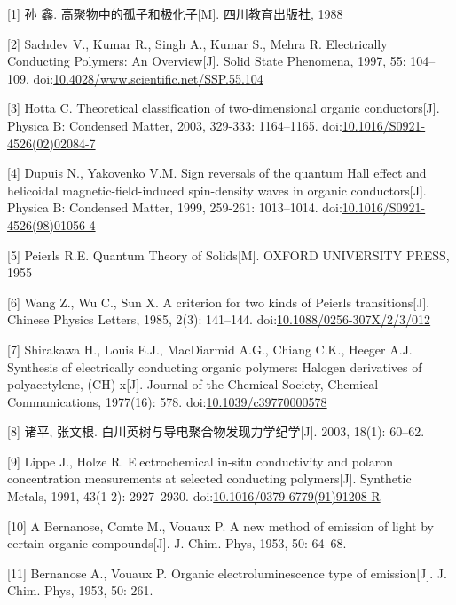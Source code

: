 \documentclass[12pt,]{report}
\begin{document}
\lhead{}  \rhead{} \thispagestyle{empty}

\setlength{\parindent}{0em}

{[}1{]} 孙 鑫. 高聚物中的孤子和极化子{[}M{]}. 四川教育出版社, 1988

{[}2{]} Sachdev V., Kumar R., Singh A., Kumar S., Mehra R. Electrically
Conducting Polymers: An Overview{[}J{]}. Solid State Phenomena, 1997,
55: 104--109.
doi:\href{http://dx.doi.org/10.4028/www.scientific.net/SSP.55.104}{10.4028/www.scientific.net/SSP.55.104}

{[}3{]} Hotta C. Theoretical classification of two-dimensional organic
conductors{[}J{]}. Physica B: Condensed Matter, 2003, 329-333:
1164--1165.
doi:\href{http://dx.doi.org/10.1016/S0921-4526(02)02084-7}{10.1016/S0921-4526(02)02084-7}

{[}4{]} Dupuis N., Yakovenko V.M. Sign reversals of the quantum Hall
effect and helicoidal magnetic-field-induced spin-density waves in
organic conductors{[}J{]}. Physica B: Condensed Matter, 1999, 259-261:
1013--1014.
doi:\href{http://dx.doi.org/10.1016/S0921-4526(98)01056-4}{10.1016/S0921-4526(98)01056-4}

{[}5{]} Peierls R.E. Quantum Theory of Solids{[}M{]}. OXFORD UNIVERSITY
PRESS, 1955

{[}6{]} Wang Z., Wu C., Sun X. A criterion for two kinds of Peierls
transitions{[}J{]}. Chinese Physics Letters, 1985, 2(3): 141--144.
doi:\href{http://dx.doi.org/10.1088/0256-307X/2/3/012}{10.1088/0256-307X/2/3/012}

{[}7{]} Shirakawa H., Louis E.J., MacDiarmid A.G., Chiang C.K., Heeger
A.J. Synthesis of electrically conducting organic polymers: Halogen
derivatives of polyacetylene, (CH) x{[}J{]}. Journal of the Chemical
Society, Chemical Communications, 1977(16): 578.
doi:\href{http://dx.doi.org/10.1039/c39770000578}{10.1039/c39770000578}

{[}8{]} 诸平, 张文根. 白川英树与导电聚合物发现力学纪学{[}J{]}. 2003,
18(1): 60--62.

{[}9{]} Lippe J., Holze R. Electrochemical in-situ conductivity and
polaron concentration measurements at selected conducting
polymers{[}J{]}. Synthetic Metals, 1991, 43(1-2): 2927--2930.
doi:\href{http://dx.doi.org/10.1016/0379-6779(91)91208-R}{10.1016/0379-6779(91)91208-R}

{[}10{]} A Bernanose, Comte M., Vouaux P. A new method of emission of
light by certain organic compounds{[}J{]}. J. Chim. Phys, 1953, 50:
64--68.

{[}11{]} Bernanose A., Vouaux P. Organic electroluminescence type of
emission{[}J{]}. J. Chim. Phys, 1953, 50: 261.
\end{document}

